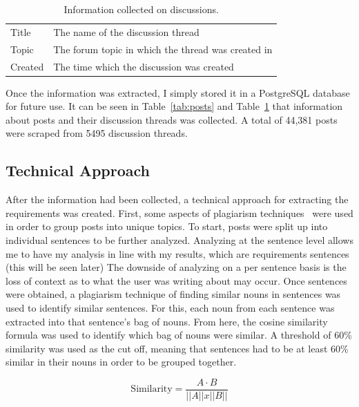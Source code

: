 \documentclass[conference]{IEEEtran}
\begin{document}
\begin{table}[h]
\begin{center}
\begin{tabular}{| l | p{6cm} |}
\hline
Title & The name of the discussion thread \\
Topic & The forum topic in which the thread was created in \\
Created & The time which the discussion was created \\
\hline
\end{tabular}
\end{center}
\caption{Information collected on discussions.\label{tab:discussions}}
\end{table}

Once the information was extracted, I simply stored it in a PostgreSQL database for future use. It can
be seen in Table~\ref{tab:posts} and Table~\ref{tab:discussions} that information about posts and their
discussion threads was collected. A total of 44,381 posts were scraped from 5495 discussion threads. 

\subsection{Technical Approach}

After the information had been collected, a technical approach for extracting the requirements was created.
First, some aspects of plagiarism techniques~\cite{Leung:2007:NLP} were used in order to group posts into unique topics. To start,
posts were split up into individual sentences to be further analyzed. Analyzing at the sentence level allows
me to have my analysis in line with my results, which are requirements sentences (this will be seen later) The
downside of analyzing on a per sentence basis is the loss of context as to what the user was writing about
may occur. Once sentences were obtained, a plagiarism technique of finding similar nouns in sentences was
used to identify similar sentences. For this, each noun from each sentence was extracted into that sentence's
bag of nouns. From here, the cosine similarity formula was used to identify which bag of nouns were similar. 
A threshold of 60\% similarity was used as the cut off, meaning that sentences had to be at least 60\% similar
in their nouns in order to be grouped together.

\begin{equation}
\text{Similarity} = \frac{ A \cdot B }{||A|| x ||B||}
\end{equation}
\end{document}

